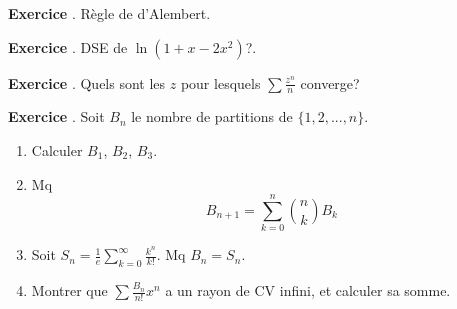 \documentclass[10pt,a4paper]{article}
\newcounter{question}
\newcounter{exo}
\newenvironment{exo}{\vspace{0.5cm}\setcounter{question}{0}\addtocounter{exo}{1} \noindent \textbf{Exercice \theexo}. \normalsize }{\par}
\begin{document}
	\begin{exo}
		Règle de d'Alembert.
	\end{exo}
	
	\begin{exo}
		DSE de $\ln(1 + x -2x^2)$?.
	\end{exo}

	\begin{exo}
		Quels sont les $z$ pour lesquels $\sum \frac{z^n}{n}$ converge?
	\end{exo}

	\begin{exo}
		Soit $B_n$ le nombre de partitions de $\lbrace 1, 2, ..., n \rbrace$.
		\begin{enumerate}
			\item Calculer $B_1$, $B_2$, $B_3$.
			\item Mq $$B_{n+1} = \sum_{k=0}^{n} \binom{n}{k} B_k$$
			\item Soit $S_n = \frac{1}{e} \sum_{k=0}^{\infty} \frac{k^n}{k!}$. Mq $B_n = S_n$.
			\item Montrer que $\sum \frac{B_n}{n!} x^n$ a un rayon de CV infini, et calculer sa somme.
		\end{enumerate}
	\end{exo}
\end{document}
